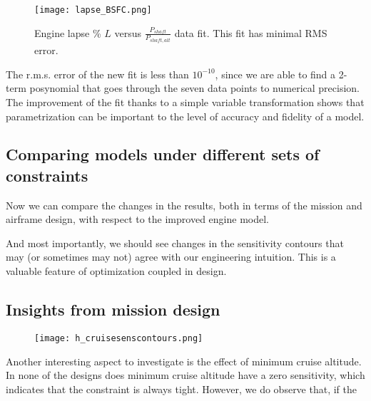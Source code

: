 \begin{center}
    \begin{figure}
        \texttt{[image: lapse\_BSFC.png]}
        \caption{Engine lapse \% $L$ versus $\frac{P_{shaft}}{P_{shaft,alt}}$ data fit. This fit has minimal
        RMS error.}
        \label{f:lapse_BSFC}
    \end{figure}
\end{center}

The r.m.s. error of the new fit is less than $10^{-10}$, since we are able to find a 2-term posynomial that
goes through the seven data points to numerical precision.
The improvement of the fit thanks to a simple variable transformation shows that
parametrization can be important to the level of accuracy and fidelity of a model.

\subsection{Comparing models under different sets of constraints}
\label{s:compare}

Now we can compare the changes in the results, both in terms of the mission and airframe design, with respect
to the improved engine model.



And most importantly, we should see changes in the sensitivity contours that may (or sometimes may not)
agree with our engineering intuition. This is a valuable feature of optimization coupled in design.

\subsection{Insights from mission design}

\begin{center}
\begin{figure}
    \texttt{[image: h\_cruisesenscontours.png]}
    \caption{}
    \label{f:h_cruisesens}
\end{figure}
\end{center}

Another interesting aspect to investigate is the effect of minimum cruise altitude. In none of the designs
does minimum cruise altitude have a zero sensitivity, which indicates that the constraint is always tight.
However, we do observe that, if the



